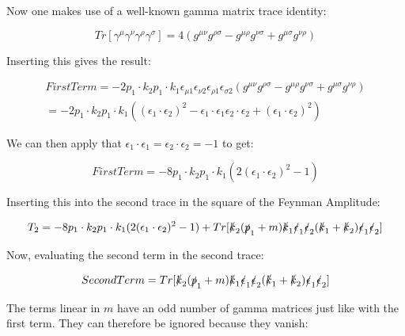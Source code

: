 \documentclass[a4]{article}
\begin{document}
    Now one makes use of a well-known gamma matrix trace identity:

    \begin{equation}
        Tr [\gamma^\mu \gamma^\nu \gamma^\rho \gamma^\sigma] = 4 (g^{\mu \nu} g^{\rho \sigma} - g^{\mu \rho} g^{\nu \sigma} + g^{\mu \sigma} g^{\nu \rho})
    \end{equation}

    Inserting this gives the result:

    \begin{eqnarray}
        First Term = -2 p_1 \cdot k_2 p_1 \cdot k_1 \epsilon_{\mu 1} \epsilon_{\nu 2} \epsilon_{\rho 1} \epsilon_{\sigma 2} (g^{\mu \nu} g^{\rho \sigma} - g^{\mu \rho} g^{\nu \sigma} + g^{\mu \sigma} g^{\nu \rho}) \\
        = - 2 p_1 \cdot k_2 p_1 \cdot k_1 ((\epsilon_1 \cdot \epsilon_2)^2 - \epsilon_1 \cdot \epsilon_1 \epsilon_2 \cdot \epsilon_2 + (\epsilon_1 \cdot \epsilon_2)^2)
    \end{eqnarray}

    We can then apply that $\epsilon_1 \cdot \epsilon_1 = \epsilon_2 \cdot \epsilon_2 = -1$ to get:

    \begin{equation}
        First Term = -8 p_1 \cdot k_2 p_1 \cdot k_1 (2 (\epsilon_1 \cdot \epsilon_2)^2 - 1)
    \end{equation}

    Inserting this into the second trace in the square of the Feynman Amplitude:

    \begin{equation}
        T_2 = - 8 p_1 \cdot k_2 p_1 \cdot k_1 (2 (\epsilon_1 \cdot \epsilon_2)^2 - 1) + Tr [\slashed{k}_2 (\slashed{p}_1 + m) \slashed{k}_1 \slashed{\epsilon}_1 \slashed{\epsilon}_2 (\slashed{k}_1 + \slashed{k}_2) \slashed{\epsilon}_1 \slashed{\epsilon}_2]
    \end{equation}

    Now, evaluating the second term in the second trace:

    \begin{equation}
        Second Term = Tr [\slashed{k}_2 (\slashed{p}_1 + m) \slashed{k}_1 \slashed{\epsilon}_1 \slashed{\epsilon}_2 (\slashed{k}_1 + \slashed{k}_2) \slashed{\epsilon}_1 \slashed{\epsilon}_2]
    \end{equation}

    The terms linear in $m$ have an odd number of gamma matrices just like with the first term. They can therefore be ignored because they vanish:
\end{document}
